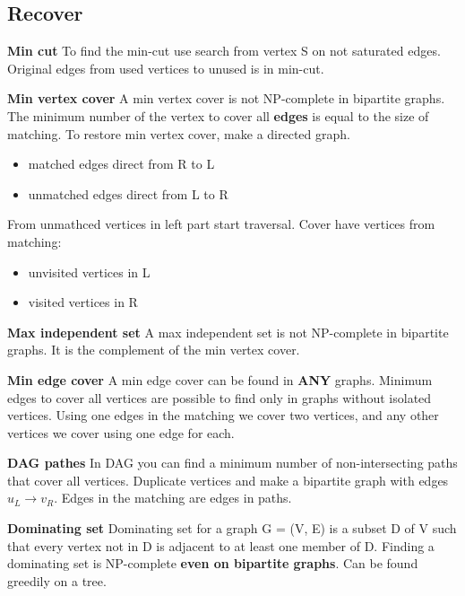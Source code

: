\subsection{Recover}
\textbf{Min cut}
To find the min-cut use search from vertex S on not saturated edges. 
Original edges from used vertices to unused is in min-cut.

\textbf{Min vertex cover}
A min vertex cover is not NP-complete in bipartite graphs. 
The minimum number of the vertex to cover all \textbf{edges} is equal to the size of matching. 
To restore min vertex cover, make a directed graph.

\begin{itemize}
\setlength\itemsep{0em}
\item matched edges direct from R to L
\item unmatched edges direct from L to R
\end{itemize}

From unmathced vertices in left part start traversal.
Cover have vertices from matching:
\begin{itemize}
\setlength\itemsep{0em}
\item unvisited vertices in L 
\item visited vertices in R
\end{itemize}

\textbf{Max independent set}
A max independent set is not NP-complete in bipartite graphs. 
It is the complement of the min vertex cover.

\textbf{Min edge cover}
A min edge cover can be found in \textbf{ANY} graphs. 
Minimum edges to cover all vertices are possible to find only in graphs without isolated vertices. 
Using one edges in the matching we cover two vertices, 
and any other vertices we cover using one edge for each. 

\textbf{DAG pathes}
In DAG you can find a minimum number of non-intersecting paths that cover all vertices. 
Duplicate vertices and make a bipartite graph with edges $u_L \rightarrow v_R$. 
Edges in the matching are edges in paths.

\textbf{Dominating set}
Dominating set for a graph G = (V, E) is a subset D of V such that every
vertex not in D is adjacent to at least one member of D. Finding a dominating set
is NP-complete \textbf{even on bipartite graphs}.
Can be found greedily on a tree.

\bigskip 
